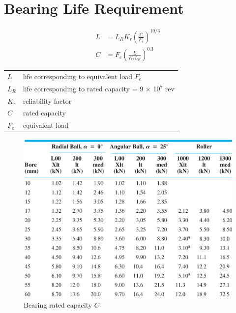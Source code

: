 \documentclass[a4paper,openany]{kaobook}
\begin{document}
\section{Bearing Life Requirement}
\label{sec:orgec47b7f}

\begin{align}
    L &= L_R K_r \left( \frac{C}{F_e} \right)^{10/3} \\
    C &= F_e \left( \frac{L}{K_r L_R} \right)^{0.3}
\end{align}

\begin{center}
\begin{tabular}{ll}
\(L\) & life corresponding to equivalent load \(F_e\)\\
\(L_R\) & life corresponding to rated capacity = 9 \(\times\) 10\(^7\) rev\\
\(K_r\) & reliability factor\\
\(C\) & rated capacity\\
\(F_e\) & equivalent load\\
\end{tabular}
\end{center}


\begin{figure}[htbp]
\centering
\includegraphics[width=.9\linewidth]{./pictures/Bearings/bearing-rated-capacity.png}
\caption{Bearing rated capacity \(C\)}
\end{figure}
\end{document}
